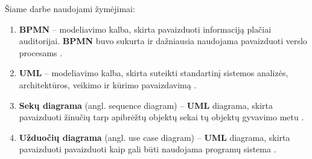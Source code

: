 \documentclass{VUMIFInfBakalaurinis}
\begin{document}
Šiame darbe naudojami žymėjimai:
\begin{enumerate}
	\item \textbf{BPMN} – modeliavimo kalba, skirta pavaizduoti informaciją plačiai auditorijai. \textbf{BPMN} buvo sukurta ir dažniausia naudojama pavaizduoti verslo procesams \cite{bpmnFormal}.
	\item \textbf{UML} – modeliavimo kalba, skirta suteikti standartinį sistemos analizės, architektūros, veikimo ir kūrimo pavaizdavimą \cite{omgUmlFormal}.
	\item \textbf{Sekų diagrama} (angl. sequence diagram) – \textbf{UML} diagrama, skirta pavaizduoti žinučių tarp apibrėžtų objektų sekai tų objektų gyvavimo metu \cite{omgUmlFormal}.
	\item \textbf{Užduočių diagrama} (angl. use case diagram) – \textbf{UML} diagrama, skirta pavaizduoti pavaizduoti kaip gali būti naudojama programų sistema \cite{algUseCasesFromBpmn}.
\end{enumerate}

\appendix  %
\end{document}
